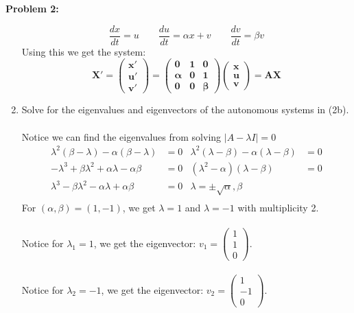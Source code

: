 \documentclass[11pt]{article}
\newenvironment{problem}[1]{\textbf{Problem #1: }}{\newpage}
\begin{document}
\begin{problem}{2}
\begin{enumerate}[label = (\alph*)]
			\[\frac{dx}{dt} = u \qquad \frac{du}{dt} = \alpha x + v \qquad \frac{dv}{dt} = \beta v\]
			Using this we get the system:
			\[\boldsymbol{X' = \begin{pmatrix}
				x' \\ u' \\ v'
			\end{pmatrix} = 
			\begin{pmatrix}
				0 & 1 & 0 \\
				\alpha & 0 & 1 \\
				0 & 0 & \beta
			\end{pmatrix}\begin{pmatrix}
				x \\ u \\ v
			\end{pmatrix} = AX}\]
			\item Solve for the eigenvalues and eigenvectors of the autonomous
			systems in (2b).
			\\ \\
			Notice we can find the eigenvalues from solving $|A - \lambda I| = 0$
			\begin{align*}
				\lambda^2\left(\beta - \lambda\right) - \alpha\left(\beta - \lambda\right) &= 0 & \lambda^2 \left(\lambda - \beta\right) - \alpha\left(\lambda - \beta\right) &= 0 \\
				-\lambda^3 + \beta \lambda^2 + \alpha \lambda - \alpha\beta &= 0 & (\lambda^2 - \alpha)(\lambda - \beta) &= 0\\
				\lambda^3 - \beta \lambda^2 - \alpha \lambda + \alpha\beta &= 0  & \lambda = \pm \sqrt{\alpha}, \beta &\\
			\end{align*}
			For $(\alpha,\beta) = (1,-1)$, we get $\lambda = 1$ and $\lambda = -1$ with multiplicity 2.
			\\ \\
			Notice for $\lambda_1 = 1$, we get the eigenvector: $v_1 = \begin{pmatrix}
				1 \\ 1 \\ 0
			\end{pmatrix}$.
			\\ \\
			Notice for $\lambda_2 = -1$, we get the eigenvector: $v_2 = \begin{pmatrix}
				1 \\ -1 \\ 0
			\end{pmatrix}$.
			\\ \\

\end{enumerate}
\end{problem}
\end{document}
